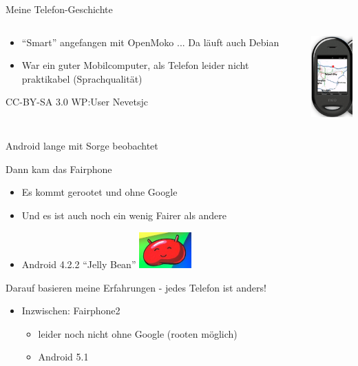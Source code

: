 \documentclass{beamer}
\begin{document}
\begin{frame}{Meine Telefon-Geschichte}
\pause
\begin{columns}[c]
  \begin{column}[T]{.88\textwidth}
    \vspace{.5cm}
    \begin{itemize}
      \item "`Smart"' angefangen mit OpenMoko ... Da läuft auch Debian
      \item War ein guter Mobilcomputer, als Telefon leider nicht praktikabel (Sprachqualität)
    \end{itemize}
    \hfill{\TINY CC-BY-SA 3.0 WP:User Nevetsjc}
  \end{column}
  \begin{column}[T]{.11\textwidth}
    \includegraphics[width=2cm]{neo.png} 
   \end{column}
\end{columns}

\end{frame}

  

\begin{frame}{Android lange mit Sorge beobachtet}

Dann kam das Fairphone
\begin{itemize}
  \item Es kommt gerootet und ohne Google
  \item Und es ist auch noch ein wenig Fairer als andere

\pause

  \item Android 4.2.2 "`Jelly Bean"' \hfill \includegraphics[width=2cm]{jellybean.png}
\end{itemize}
  
  Darauf basieren meine Erfahrungen - jedes Telefon ist anders!
\pause

\begin{itemize}
  \item Inzwischen: Fairphone2 
  \begin{itemize}
    \item leider noch nicht ohne Google (rooten möglich)
    \item Android 5.1
  \end{itemize}
\end{itemize}

\end{frame}
\end{document}
